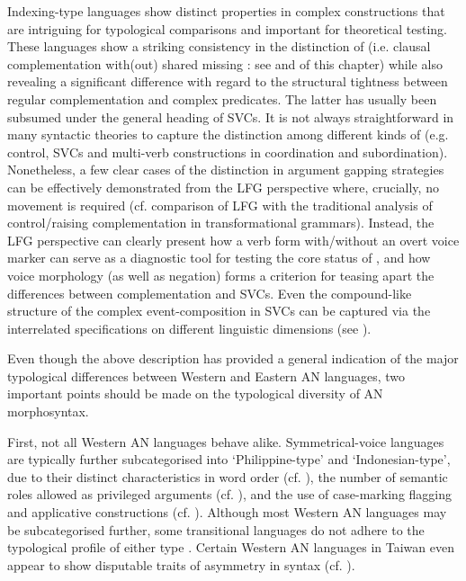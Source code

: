 \documentclass[output=paper,chinesefont]{../langscibook}
\begin{document}
Indexing-type languages show distinct properties in complex constructions that are intriguing for typological comparisons and important for theoretical testing. These languages show a striking consistency in the distinction of \OPTXCOMP (i.e. clausal complementation with(out) shared missing \SUBJ: see  and  of this chapter) while also revealing a significant difference with regard to the structural tightness between regular complementation and complex predicates. The latter has usually been subsumed under the general heading of SVCs. It is not always straightforward in many syntactic theories to capture the distinction among different kinds of \OPTXCOMP (e.g. control, SVCs and multi-verb constructions in coordination and subordination). Nonetheless, a few clear cases of the distinction in argument gapping strategies can be effectively demonstrated from the LFG perspective where, crucially, no movement is required (cf.  comparison of LFG with the traditional analysis of control/raising complementation in transformational grammars). Instead, the LFG perspective can clearly present how a verb form with/without
an overt voice marker can serve as a diagnostic tool for testing the core status of \OPTXCOMP, and how voice morphology (as well as negation) forms a criterion for teasing apart the differences between complementation and SVCs. Even the compound-like structure of the complex event-composition in SVCs can be captured via the interrelated specifications on different linguistic dimensions (see ).

Even though the above description has provided a general indication of the major typological differences between Western and Eastern AN languages, two important points should be made on the typological diversity of AN morphosyntax.

\hspace*{-.3pt}First, not all Western AN languages behave alike. Symmetrical-voice languages are typically further subcategorised into `Philippine-type' and `Indonesian-type', due to their distinct characteristics in word order (cf. ), the number of semantic roles allowed as privileged arguments (cf. ), and the use of case-marking flagging and applicative constructions (cf. ). Although most Western AN languages may be subcategorised further, some transitional languages do not adhere to the typological profile of either type \citep{Kroeger:NonMalayic}. Certain Western AN languages in Taiwan even appear to show disputable traits of asymmetry in syntax (cf. ).
\end{document}
